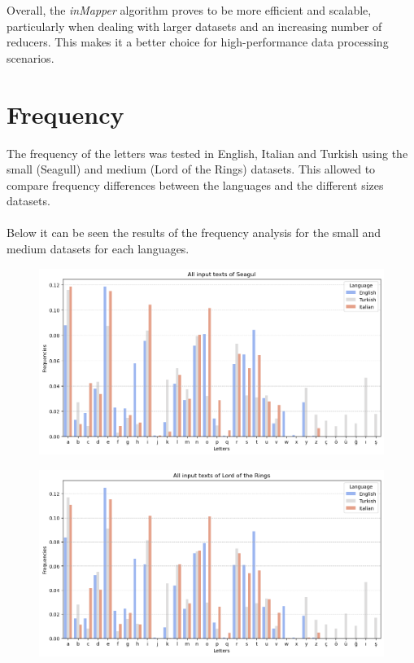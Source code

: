 Overall, the \textit{inMapper} algorithm proves to be more efficient and scalable, particularly when dealing with larger datasets and an increasing number of reducers. This makes it a better choice for high-performance data processing scenarios.


\newpage

\section{Frequency}
The frequency of the letters was tested in English, Italian and Turkish using the small (Seagull) and medium (Lord of the Rings) datasets. 
This allowed to compare frequency differences between the languages and the different sizes datasets.\\ \\
Below it can be seen the results of the frequency analysis for the small and medium datasets for each languages.

\begin{figure}[h]
    \centering
    \includegraphics[width=1\textwidth]{media/allSeagul.png}
\end{figure}

\begin{figure}[h]
    \centering
    \includegraphics[width=1\textwidth]{media/allLordOfTheRings.png}
\end{figure}

